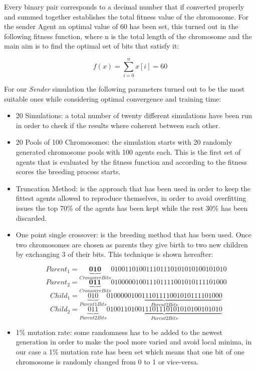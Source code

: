 \documentclass[a4paper]{article}
\begin{document}
Every binary pair corresponds to a decimal number that if converted properly and summed together establishes the total fitness value of the chromosome. For the sender Agent an optimal value of 60 has been set, this turned out in the following fitness function, where n is the total length of the chromosome and the main aim is to find the optimal set of bits that satisfy it:

\begin{equation}
	f(x) = \sum\limits_{i=0}^{n} x[i] = 60
\end{equation} 

For our \textit{Sender} simulation the following parameters turned out to be the most suitable ones while considering optimal convergence and training time:

\begin{itemize}

\item 20 Simulations: a total number of twenty different simulations have been run in order to check if the results where coherent between each other.
\item 20 Pools of 100 Chromosomes: the simulation starts with 20 randomly generated chromosome pools with 100 agents each. This is the first set of agents that is evaluated by the fitness function and according to the fitness scores the breeding process starts. 
\item Truncation Method: is the approach that has been used in order to keep the fittest agents allowed to reproduce themselves, in order to avoid overfitting issues the top 70\% of the agents has been kept while the rest 30\% has been discarded.
\item One point single crossover: is the breeding method that has been used. Once two chromosomes are chosen as parents they give birth to two new children by exchanging 3 of their bits. This technique is shown hereafter:

\begin{equation}
	Parent_1 = \underbrace{\textbf{010}}_{Crossover Bits}{010011010011101110101010100101010}
\end{equation}
\begin{equation}
	Parent_2 = \underbrace{\textbf{011}}_{Crossover Bits}{010000010011101111001010111101000}
\end{equation}
\begin{equation}
	Child_1 = \underbrace{010}_{Parent 1 Bits} \underbrace{010000010011101111001010111101000}_{Parent 2 Bits}
\end{equation}
\begin{equation}
	Child_2 = \underbrace{011}_{Parent 2 Bits}\underbrace{010011010011101110101010100101010}_{Parent 2 Bits}
\end{equation}

\item 1\% mutation rate: some randomness has to be added to the newest generation in order to make the pool more varied and avoid local minima, in our case a 1\% mutation rate has been set which means that one bit of one chromosome is randomly changed from 0 to 1 or vice-versa.  

\end{itemize}
\end{document}
